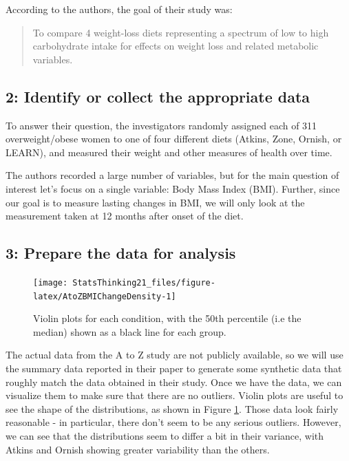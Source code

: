\documentclass[12pt,]{book}
\theoremstyle{definition}
\theoremstyle{definition}
\theoremstyle{definition}
\theoremstyle{remark}
\begin{document}
According to the authors, the goal of their study was:

\begin{quote}
To compare 4 weight-loss diets representing a spectrum of low to high carbohydrate intake for effects on weight loss and related metabolic variables.
\end{quote}

\hypertarget{identify-or-collect-the-appropriate-data}{%
\subsection{2: Identify or collect the appropriate data}\label{identify-or-collect-the-appropriate-data}}

To answer their question, the investigators randomly assigned each of 311 overweight/obese women to one of four different diets (Atkins, Zone, Ornish, or LEARN), and measured their weight and other measures of health over time.

The authors recorded a large number of variables, but for the main question of interest let's focus on a single variable: Body Mass Index (BMI). Further, since our goal is to measure lasting changes in BMI, we will only look at the measurement taken at 12 months after onset of the diet.

\hypertarget{prepare-the-data-for-analysis}{%
\subsection{3: Prepare the data for analysis}\label{prepare-the-data-for-analysis}}

\begin{figure}
\texttt{[image: StatsThinking21\_files/figure-latex/AtoZBMIChangeDensity-1]} \caption{Violin plots for each condition, with the 50th percentile (i.e the median) shown as a black line for each group.}\label{fig:AtoZBMIChangeDensity}
\end{figure}

The actual data from the A to Z study are not publicly available, so we will use the summary data reported in their paper to generate some synthetic data that roughly match the data obtained in their study. Once we have the data, we can visualize them to make sure that there are no outliers. Violin plots are useful to see the shape of the distributions, as shown in Figure \ref{fig:AtoZBMIChangeDensity}. Those data look fairly reasonable - in particular, there don't seem to be any serious outliers. However, we can see that the distributions seem to differ a bit in their variance, with Atkins and Ornish showing greater variability than the others.
\end{document}
